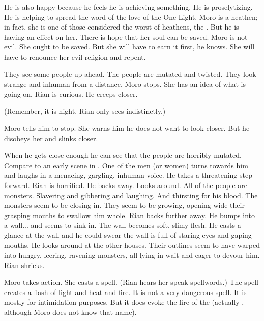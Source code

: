 He is also happy because he feels he is achieving something. 
He is proselytizing. 
He is helping to spread the word of the love of the One Light. 
Moro is a heathen; in fact, she is one of those considered the worst of heathens, the \rethyaxes. 
But he is having an effect on her.
There is hope that her soul can be saved. 
Moro is not evil. 
She ought to be saved. 
But she will have to earn it first, he knows.
She will have to renounce her evil religion and repent.

\begin{comment}
  \section{Revelation of the Beyond}
\end{comment}
They see some people up ahead. 
The people are mutated and twisted. 
They look strange and inhuman from a distance. 
Moro stops.
She has an idea of what is going on. 
Rian is curious.
He creeps closer. 

(Remember, it is night. Rian only sees indistinctly.)

Moro tells him to stop.
She warns him he does not want to look closer. 
But he disobeys her and slinks closer. 

When he gets close enough he can see that the people are horribly mutated. 
Compare to an early scene in \cite{Movie:IntheMouthofMadness}. 
One of the men (or women) turns towards him and laughs in a menacing, gargling, inhuman voice. 
He takes a threatening step forward. 
Rian is horrified.
He backs away. 
Looks around. 
All of the people are monsters.
Slavering and gibbering and laughing.
And thirsting for his blood. 
The monsters seem to be closing in.
They seem to be growing, opening wide their grasping mouths to swallow him whole. 
Rian backs further away.
He bumps into a wall... and seems to sink in.
The wall becomes soft, slimy flesh. 
He casts a glance at the wall and he could swear the wall is full of staring eyes and gaping mouths. 
He looks around at the other houses.
Their outlines seem to have warped into hungry, leering, ravening monsters, all lying in wait and eager to devour him. 
Rian shrieks. 

\begin{comment}
  \section{Moro scares off attackers}
\end{comment}
Moro takes action. 
She casts a spell. 
(Rian hears her speak spellwords.)
The spell creates a flash of light and heat and fire. 
It is not a very dangerous spell.
It is mostly for intimidation purposes. 
But it does evoke the fire of the \Primordials (actually \RuinSatha, although Moro does not know that name). 


